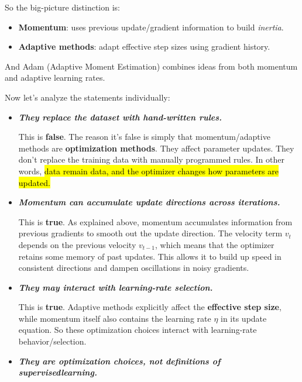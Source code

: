 \highspace
So the big-picture distinction is:
\begin{itemize}
    \item \textbf{Momentum}: uses previous update/gradient information to build \emph{inertia}.
    \item \textbf{Adaptive methods}: adapt effective step sizes using gradient history.
\end{itemize}
And Adam (Adaptive Moment Estimation) combines ideas from both momentum and adaptive learning rates.

\highspace
Now let's analyze the statements individually:
\begin{itemize}
    \item[\textcolor{Red2}{\faIcon{times}}] \textcolor{Red2}{\textbf{\emph{They replace the dataset with hand-written rules.}}}

        This is \textbf{false}. The reason it's false is simply that momentum/adaptive methods are \textbf{optimization methods}. They affect parameter updates. They don't replace the training data with manually programmed rules. In other words, \hl{data remain data, and the optimizer changes how parameters are updated.}

    \item[\textcolor{Green3}{\faIcon{check}}] \textcolor{Green3}{\textbf{\emph{Momentum can accumulate update directions across iterations.}}}

        This is \textbf{true}. As explained above, momentum accumulates information from previous gradients to smooth out the update direction. The velocity term $v_t$ depends on the previous velocity $v_{t-1}$, which means that the optimizer retains some memory of past updates. This allows it to build up speed in consistent directions and dampen oscillations in noisy gradients.

    \item[\textcolor{Green3}{\faIcon{check}}] \textcolor{Green3}{\textbf{\emph{They may interact with learning-rate selection.}}}

        This is \textbf{true}. Adaptive methods explicitly affect the \textbf{effective step size}, while momentum itself also contains the learning rate $\eta$ in its update equation. So these optimization choices interact with learning-rate behavior/selection.

    \item[\textcolor{Green3}{\faIcon{check}}] \textcolor{Green3}{\textbf{\emph{They are optimization choices, not definitions of supervised\break learning.}}}


\end{itemize}
